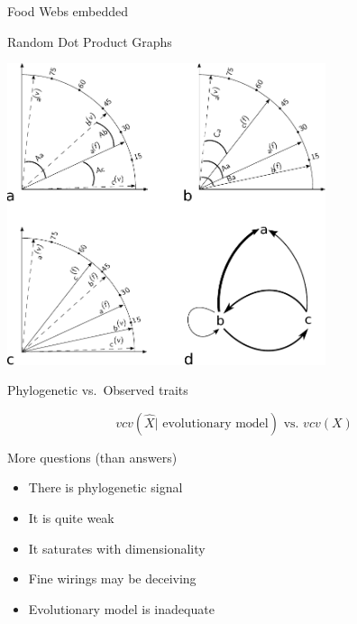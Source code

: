 \documentclass[ignorenonframetext,]{beamer}
\begin{document}
\begin{frame}{Food Webs embedded}

\begin{block}{Random Dot Product Graphs}

\begin{centering}
\includegraphics[width=0.7\textwidth]{images/RDPGmodel.pdf}
\end{centering}

\end{block}

\begin{block}{Phylogenetic vs.~Observed traits}

\begin{equation*}
vcv\left( \hat{X} | \mbox{ evolutionary model} \right) \mbox{ vs. } vcv\left(X\right)
\end{equation*}

\end{block}

\end{frame}

\begin{frame}{More questions (than answers)}

\begin{itemize}[<+->]
\itemsep1pt\parskip0pt
\item
  There is phylogenetic signal
\item
  It is quite weak
\item
  It saturates with dimensionality
\item
  Fine wirings may be deceiving
\item
  Evolutionary model is inadequate
\end{itemize}

\end{frame}
\end{document}
